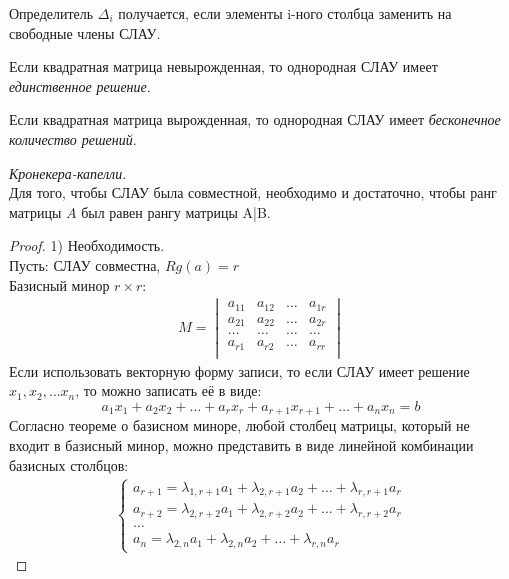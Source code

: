 \begin{note}
  Определитель $\Delta_i$ получается, если элементы i-ного столбца заменить на свободные члены СЛАУ.
\end{note}

Если квадратная матрица невырожденная, то однородная СЛАУ имеет \textit{единственное решение}. 

Если квадратная матрица вырожденная, то однородная СЛАУ имеет \textit{бесконечное количество решений}. 

\begin{theorem}
  \textit{Кронекера-капелли}. \\
  Для того, чтобы СЛАУ была совместной, необходимо и достаточно, чтобы ранг матрицы $A$ был равен рангу матрицы A|B.
\end{theorem}
\begin{proof}
  1) Необходимость. \\
  Пусть: СЛАУ совместна, $Rg(a) = r$\\
  Базисный минор  $r \times r$:
  \begin{gather*}
    M =
    \begin{vmatrix} 
      a_{11} & a_{12} & \ldots & a_{1r} \\ 
      a_{21} & a_{22} & \ldots & a_{2r} \\ 
      \ldots & \ldots & \ldots & \ldots \\
      a_{r1} & a_{r2} & \ldots & a_{rr} \\ 
    \end{vmatrix} 
  \end{gather*}
  Если использовать векторную форму записи, то если СЛАУ имеет решение $x_1, x_2, \ldots x_{n}$, то можно записать её в виде: \[
      a_1x_1 + a_2x_2 + \ldots + a_r x_r + a_{r+1} x_{r+1} + \ldots + a_{n} x_{n} = b \tag{1}
  \]
  Согласно теореме о базисном миноре, любой столбец матрицы, который не входит в базисный минор, можно представить в виде линейной комбинации базисных столбцов:
  \begin{gather*}
    \begin{cases}
      a_{r+1} = \lambda_{1,r+1} a_1 + \lambda_{2,r+1} a_2 + \ldots + \lambda_{r,r+1} a_r \\
      a_{r+2} = \lambda_{2,r+2} a_1 + \lambda_{2,r+2} a_2 + \ldots + \lambda_{r,r+2} a_r \\
      \ldots \\
      a_{n} = \lambda_{2,n} a_1 + \lambda_{2,n} a_2 + \ldots + \lambda_{r,n} a_r
    \end{cases} \tag{2} 

\end{gather*}
\end{proof}
